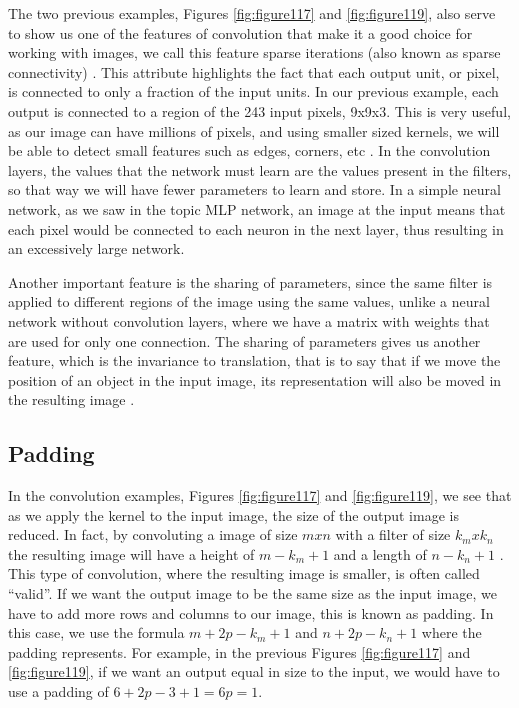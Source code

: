 The two previous examples, Figures \ref{fig:figure117} and \ref{fig:figure119}, also serve to show us one of the features of convolution that make it a good choice for working with images, we call this feature sparse iterations (also known as sparse connectivity) \cite{goodfellow2016}. This attribute highlights the fact that each output unit, or pixel, is connected to only a fraction of the input units. In our previous example, each output is connected to a region of the 243 input pixels, 9x9x3. This is very useful, as our image can have millions of pixels, and using smaller sized kernels, we will be able to detect small features such as edges, corners, etc \cite{goodfellow2016}. In the convolution layers, the values that the network must learn are the values present in the filters, so that way we will have fewer parameters to learn and store. In a simple neural network, as we saw in the topic MLP network, an image at the input means that each pixel would be connected to each neuron in the next layer, thus resulting in an excessively large network.

Another important feature is the sharing of parameters, since the same filter is applied to different regions of the image using the same values, unlike a neural network without convolution layers, where we have a matrix with weights that are used for only one connection. The sharing of parameters gives us another feature, which is the invariance to translation, that is to say that if we move the position of an object in the input image, its representation will also be moved in the resulting image \cite{goodfellow2016}.

\subsection{Padding}

In the convolution examples, Figures \ref{fig:figure117} and \ref{fig:figure119}, we see that as we apply the kernel to the input image, the size of the output image is reduced. In fact, by convoluting a image of size $m x n$ with a filter of size $k_m x k_n$ the resulting image will have a height of $m-k_m+1$ and a length of $n-k_n+1$ . This type of convolution, where the resulting image is smaller, is often called “valid”.
If we want the output image to be the same size as the input image, we have to add more rows and columns to our image, this is known as padding. In this case, we use the formula  $m+2p-k_m+1$ and $n+2p-k_n+1$ where the padding represents. For example, in the previous Figures \ref{fig:figure117} and \ref{fig:figure119}, if we want an output equal in size to the input, we would have to use a padding of $6+2p-3+1=6p=1$.

